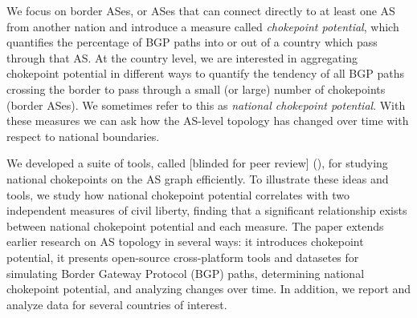 We focus on border ASes, or ASes that can connect directly to at least
one AS from another nation and introduce a measure called \emph{chokepoint potential}, which quantifies the percentage of BGP paths into or out of a country which pass through that AS.  At the country level, we are interested in aggregating chokepoint potential in different ways to quantify the tendency of all BGP paths crossing the border to pass through a small (or large) number of chokepoints (border ASes). We sometimes refer to this as \emph{national chokepoint potential}.
With these measures 
we can ask how the AS-level topology has changed over time with respect
to national boundaries. 

We developed a
suite of tools, called [blinded for peer review] (\toolname{}), for studying national 
chokepoints on
the AS graph efficiently. To illustrate these ideas and tools, we
study how national chokepoint potential correlates with two independent
measures of civil liberty, finding that a significant relationship exists between national chokepoint potential and each measure.
The paper extends earlier research on AS topology in several ways: it introduces chokepoint potential, it presents open-source cross-platform tools and datasetes for simulating Border Gateway Protocol (BGP) paths,
determining national chokepoint potential, and analyzing changes over time.  In addition, we report and analyze data for several countries of interest.


